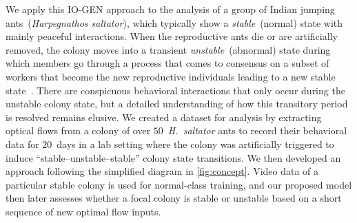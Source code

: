 \documentclass[letterpaper]{article} %
\let\orgautoref\autoref
\renewcommand{\autoref}
{\def\equationautorefname{Equation}%
	\def\figureautorefname{Fig.}%
	\def\subfigureautorefname{Fig.}%
	\def\Itemautorefname{item}%
	\def\tableautorefname{Table}%
	\def\exerciseautorefname{Exercise}%
	\def\starexerciseautorefname{Exercise}%
	\def\sectionautorefname{Section}%
	\def\subsectionautorefname{Section}%
	\def\subsubsectionautorefname{Section}%
	\def\chapterautorefname{Section}%
	\def\partautorefname{Part}%
	\orgautoref}
\begin{document}
We apply this \mbox{IO-GEN} approach to the analysis of a group of Indian 
jumping ants~(\emph{Harpegnathos saltator}), which typically show a 
\emph{stable}~(normal) state with mainly peaceful interactions. 
When the reproductive ants die or are artificially removed, 
the colony moves into a transient \emph{unstable}~(abnormal) state during 
which members go through a process that comes to consensus on a subset of 
workers that become the new reproductive individuals leading to a 
new stable state~\citep{SPSHPL16}.
There are conspicuous behavioral interactions that only occur during 
the unstable colony state, but a detailed understanding of how this
transitory period is resolved remains elusive. 
We created a dataset for analysis by
extracting optical flows from a colony of over $50$~\emph{H.~saltator}
ants to record their behavioral data for $20$~days in a lab setting
where the colony was artificially triggered to induce
``stable--unstable--stable'' colony state transitions. We then developed
an approach following the simplified diagram in \autoref{fig:concept}.
Video data of a particular stable colony is used for normal-class
training, and our proposed model then later assesses whether a focal
colony is stable or unstable based on a short sequence of new optimal
flow inputs.

\end{document}
